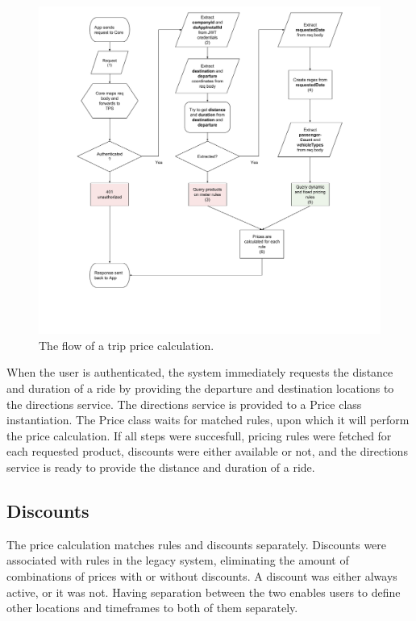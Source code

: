 \begin{figure}[H]
	\centering
	\includegraphics[width=1\textwidth]{Calculation}
	\caption[Calculation Flow]{The flow of a trip price calculation.}
	\label{fig:Calculation}
\end{figure}

When the user is authenticated, the system immediately requests the distance and duration of a ride by providing the departure and destination locations to the directions service. The directions service is provided to a Price class instantiation. The Price class waits for matched rules, upon which it will perform the price calculation. If all steps were succesfull, pricing rules were fetched for each requested product, discounts were either available or not, and the directions service is ready to provide the distance and duration of a ride.

%
\subsection{Discounts}
The price calculation matches rules and discounts separately. Discounts were associated with rules in the legacy system, eliminating the amount of combinations of prices with or without discounts. A discount was either always active, or it was not. Having separation between the two enables users to define other locations and timeframes to both of them separately.


